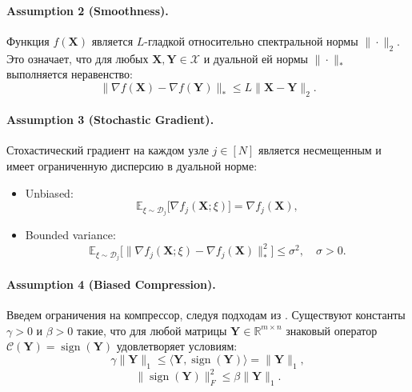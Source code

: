 \documentclass{article}
\begin{document}
\paragraph{Assumption 2 (Smoothness).} Функция $f(\mathbf{X})$ является $L$-гладкой относительно спектральной нормы $\|\cdot\|_2$. Это означает, что для любых $\mathbf{X}, \mathbf{Y} \in \mathcal{X}$ и дуальной ей нормы $\|\cdot\|_*$ выполняется неравенство:
\begin{equation}
\|\nabla f(\mathbf{X}) - \nabla f(\mathbf{Y})\|_* \le L \|\mathbf{X} - \mathbf{Y}\|_2.
\end{equation}

\paragraph{Assumption 3 (Stochastic Gradient).} 
Стохастический градиент на каждом узле $j \in [N]$ является несмещенным и имеет ограниченную дисперсию в дуальной норме:
\begin{itemize}
    \item Unbiased: \begin{equation}
    \mathbb{E}_{\xi \sim \mathcal{D}_j}\bigl[\nabla f_j(\mathbf{X};\xi)\bigr] = \nabla f_j(\mathbf{X}),
    \end{equation}
    \item Bounded variance: \begin{equation}
    \mathbb{E}_{\xi \sim \mathcal{D}_j}\bigl[\|\nabla f_j(\mathbf{X};\xi) - \nabla f_j(\mathbf{X})\|_*^2\bigr] \le \sigma^2, \quad \sigma > 0.
    \end{equation}
\end{itemize}

\paragraph{Assumption 4 (Biased Compression).} Введем ограничения на компрессор, следуя подходам из \cite{beznosikov2020biased}. Существуют константы $\gamma > 0$ и $\beta > 0$ такие, что для любой матрицы $\mathbf{Y} \in \mathbb{R}^{m \times n}$ знаковый оператор $\mathcal{C}(\mathbf{Y}) = \operatorname{sign}(\mathbf{Y})$ удовлетворяет условиям:
\begin{equation}
\gamma \|\mathbf{Y}\|_1 \le \langle \mathbf{Y}, \operatorname{sign}(\mathbf{Y}) \rangle = \|\mathbf{Y}\|_1,
\end{equation}
\begin{equation}
\|\operatorname{sign}(\mathbf{Y})\|_F^2 \le \beta \|\mathbf{Y}\|_1.
\end{equation}
 
\end{document}
